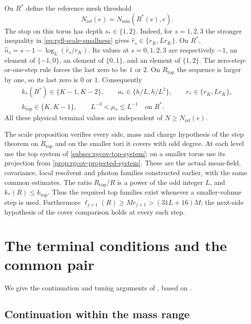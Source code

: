 On $R^*$ define the reference mesh threshold
\begin{equation}\label{eq:rgfl-reference-threshold}
                    N_{\mathrm{ref}}(e)=N_{\min}(R^*(e),e).
\end{equation}
The stop on this torus has depth $s_*\in\{1,2\}$.
Indeed, for $s=1,2,3$ the stronger inequality in
\eqref{eq:rgfl-scale-smallness} gives
$\widehat r_s\in\{r_K,Lr_K\}$.
On $R^*$,
$\widehat n_s=s-1-\log_L(\widehat r_s/r_K)$.
Its values at $s=0,1,2,3$ are respectively
$-1$, an element of $\{-1,0\}$, an element of
$\{0,1\}$, and an element of $\{1,2\}$.
The zero-step-or-one-step rule forces the last zero
to be $1$ or $2$. On $R_{\mathrm{top}}$ the sequence
is larger by one, so its last zero is $0$ or $1$.
Consequently
\begin{equation}\label{eq:rgfl-reference-stop}
 \begin{gathered}
 k_*(R^*)\in\{K-1,K-2\},\qquad
 a_*\in\{h/L,h/L^2\},\qquad r_*\in\{r_K,Lr_K\},\\
 k_{\mathrm{top}}\in\{K,K-1\},\qquad
 L^{-3}<\mu_*\le L^{-1}\quad\text{on }R^* .
 \end{gathered}
\end{equation}
All these physical terminal values are independent
of $N\ge N_{\mathrm{ref}}(e)$.

The scale proposition verifies every side, mass
and charge hypothesis of the step theorem
on $R_{\mathrm{top}}$ and on the smaller tori it covers with odd degree.
At each level use the top system of
\cref{subsec:rgcov-top-system}; on a smaller
torus use its projection from
\cref{prop:rgcov-projected-system}.
These are the actual mean-field, covariance,
local resolvent and photon families constructed
earlier, with the same common estimates.
The ratio $R_{\mathrm{top}}/R$ is a power of the
odd integer $L$, and $k_*(R)\le k_{\mathrm{top}}$.
Thus the required top families exist whenever
a smaller-volume step is used.
Furthermore
$\ell_{j+1}(R)\ge Mr_{j+1}>(31L+16)M$;
the next-side hypothesis of the cover comparison
holds at every such step.

\section{The terminal conditions and the common pair}\label{sec:common-tuning}

We give the continuation and tuning arguments of
\cite[\S\S16.2--16.4]{QED3Master}, based on
\cite[Chapter~28]{ChamberRG}.

\subsection{Continuation within the mass range}
\label{subsec:rgfl-continuation}


